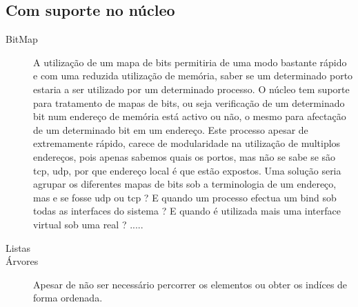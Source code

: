 \subsection{Com suporte no núcleo}

\begin{description}

\item[BitMap]

A utilização de um mapa de bits permitiria de uma modo bastante rápido e com uma reduzida utilização de memória, saber se um determinado porto estaria a ser utilizado por um determinado processo.
O núcleo tem suporte para tratamento de mapas de bits, ou seja verificação de um determinado bit num endereço de memória está activo ou não, o mesmo para afectação de um determinado bit em um endereço.
Este processo apesar de extremamente rápido, carece de modularidade na utilização de multiplos endereços, pois apenas sabemos quais os portos, mas não se sabe se são tcp, udp, por que endereço local é que estão expostos. 
Uma solução seria agrupar os diferentes mapas de bits sob a terminologia de um endereço, mas e se fosse udp ou tcp ?
E quando um processo efectua um bind sob todas as interfaces do sistema ? 
E quando é utilizada mais uma interface virtual sob uma real ? .....


\item[Listas]






\item[Árvores]
Apesar de não ser necessário percorrer os elementos ou obter os indíces de forma ordenada. 



\end{description}
